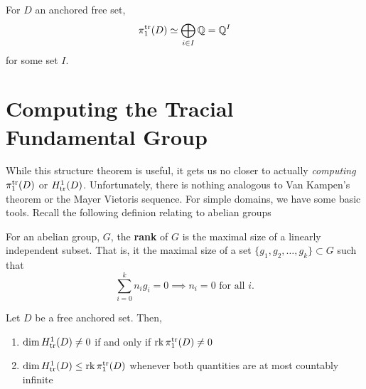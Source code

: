 \begin{theorem}
  For \(D\) an anchored free set,
  \[
    \pi_1^{\operatorname{tr}}(D) \simeq \bigoplus_{i \in I} \mathbb{Q} = \mathbb{Q} ^I
  \]
  for some set \(I\).
\end{theorem}

\section{Computing the Tracial Fundamental Group}%
\label{sec:interplay}

While this structure theorem is useful, it gets us no closer to actually
\emph{computing} \(\pi_1^{\operatorname{tr}}(D)\) or \(H^1_{\operatorname{tr}}(D)\). Unfortunately, there
is nothing analogous to Van Kampen's theorem or the Mayer Vietoris sequence. For
simple domains, we have some basic tools. Recall the following definion relating
to abelian groups

\begin{definition}[Rank]%
\label{def:rank}
  For an abelian group, \(G\), the \textbf{rank} of \(G\) is the maximal size of
  a linearly independent subset. That is, it the maximal size of a set
  \(\{g_1, g_2, \dots ,g_k\} \subset G\) such that
  \[
    \sum_{i=0}^k n_ig_i =0 \implies n_i=0 \textrm{ for all }i.
  \]
\end{definition}

\begin{theorem}
  Let \(D\) be a free anchored set. Then,

\begin{enumerate}
  \item \(\dim H_{\operatorname{tr}}^1(D)\neq 0\) if and only if \(\operatorname{rk} \pi_1^{\operatorname{tr}}(D)\neq 0\)
  \item \(\dim H_{\operatorname{tr}}^1(D) \leq \operatorname{rk} \pi_1^{\operatorname{tr}}(D)\) whenever both
      quantities are at most countably infinite
\end{enumerate}
\end{theorem}


